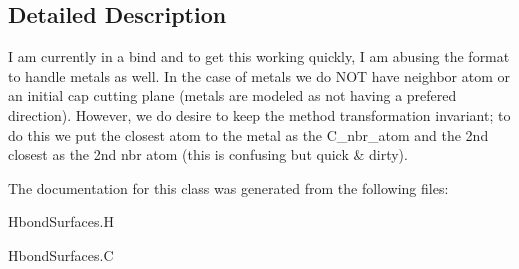 \subsection{Detailed Description}
I am currently in a bind and to get this working quickly, I am abusing the format to handle metals as well. In the case of metals we do NOT have neighbor atom or an initial cap cutting plane (metals are modeled as not having a prefered direction). However, we do desire to keep the method transformation invariant; to do this we put the closest atom to the metal as the C\_\-nbr\_\-atom and the 2nd closest as the 2nd nbr atom (this is confusing but quick \& dirty). 



The documentation for this class was generated from the following files:\begin{CompactItemize}
\item 
Hbond\-Surfaces.H\item 
Hbond\-Surfaces.C\end{CompactItemize}
